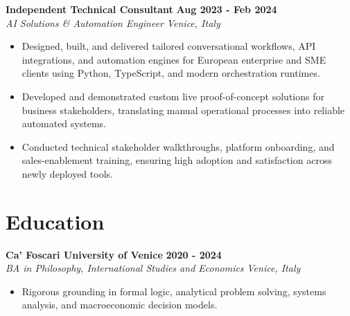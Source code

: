 \documentclass[10pt,a4paper]{article}
\newcommand{\role}[4]{%
  \textbf{#1} \hfill \textbf{#2}\\[1pt]%
  \textit{#3} \hfill \textit{#4}\\[2pt]%
}
\begin{document}
\role{Independent Technical Consultant}{Aug 2023 - Feb 2024}{AI Solutions \& Automation Engineer}{Venice, Italy}
\begin{itemize}
  \item Designed, built, and delivered tailored conversational workflows, API integrations, and automation engines for European enterprise and SME clients using Python, TypeScript, and modern orchestration runtimes.
  \item Developed and demonstrated custom live proof-of-concept solutions for business stakeholders, translating manual operational processes into reliable automated systems.
  \item Conducted technical stakeholder walkthroughs, platform onboarding, and sales-enablement training, ensuring high adoption and satisfaction across newly deployed tools.
\end{itemize}

\section{Education}
\role{Ca' Foscari University of Venice}{2020 - 2024}{BA in Philosophy, International Studies and Economics}{Venice, Italy}
\begin{itemize}
  \item Rigorous grounding in formal logic, analytical problem solving, systems analysis, and macroeconomic decision models.
\end{itemize}
\end{document}
